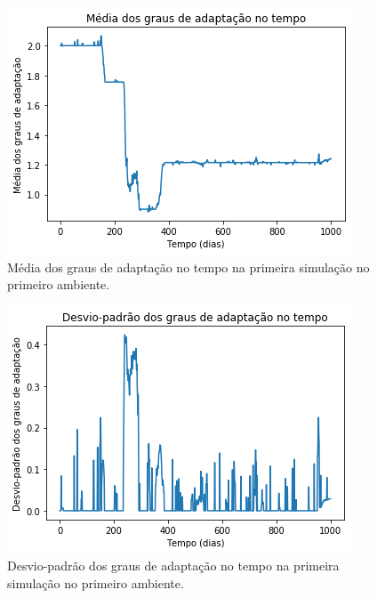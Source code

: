 \documentclass[10pt,brazil,english]{article}
\begin{document}
            \begin{figure}[!hbtp]
                \begin{center}
                    \includegraphics[scale=0.5]{Images/1-1.png}
                \end{center}
                \caption{Média dos graus de adaptação no tempo na primeira simulação no primeiro ambiente.}
                \label{Fig1}
            \end{figure} 
            
            \begin{figure}[!hbtp]
                \begin{center}
                    \includegraphics[scale=0.5]{Images/1-2.png}
                \end{center}
                \caption{Desvio-padrão dos graus de adaptação no tempo na primeira simulação no primeiro ambiente.}
                \label{Fig2}
            \end{figure} 
            
\end{document}
